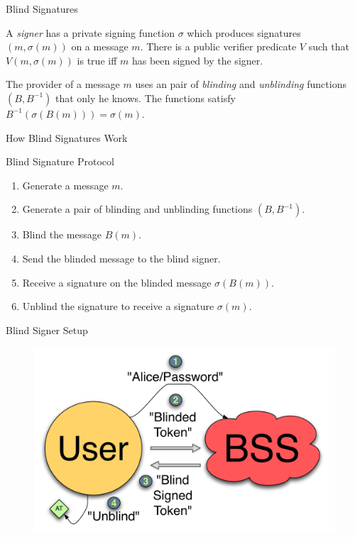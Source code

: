 \documentclass[handout]{beamer}
\begin{document}
\begin{frame}{Blind Signatures}

\begin{definition}
A \emph{signer} has a private signing function $\sigma$ which produces
signatures $(m, \sigma(m))$ on a message $m$. There is a public verifier
predicate $V$ such that $V(m, \sigma(m))$ is true iff $m$ has been signed by the
signer.
\end{definition}


\begin{definition}
The provider of a message $m$ uses an pair of \emph{blinding} and
\emph{unblinding} functions $(B,B^{-1})$ that only he knows. The functions
satisfy $B^{-1}(\sigma(B(m))) = \sigma(m).$
\end{definition}

\end{frame}

\begin{frame}{How Blind Signatures Work}

\begin{alertblock}{Blind Signature Protocol}
  \begin{enumerate}
    \item<1-> Generate a message $m$.
    \item<2-> Generate a pair of blinding and unblinding functions $(B,B^{-1})$.
    \item<3-> Blind the message $B(m)$.
    \item<4-> Send the blinded message to the blind signer.
    \item<5-> Receive a signature on the blinded message $\sigma(B(m))$.
    \item<6-> Unblind the signature to receive a signature $\sigma(m)$.
  \end{enumerate}
\end{alertblock}

\end{frame}

\begin{frame}{Blind Signer Setup}
  \begin{figure}
    \centering
    \includegraphics[scale=0.5]{figs/fig-bss-setup-color.pdf}
  \end{figure}
\end{frame}
\end{document}
